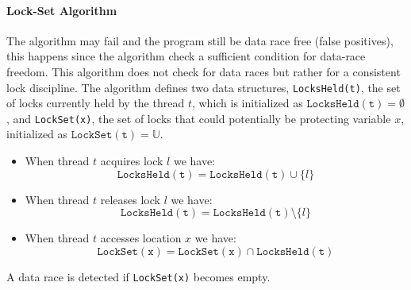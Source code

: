 \paragraph{Lock-Set Algorithm}
The algorithm may fail and the program still be data race free (false positives),
this happens since the algorithm check a sufficient condition for data-race freedom.
This algorithm does not check for data races but rather for a consistent lock discipline.
The algorithm defines two data structures, \texttt{LocksHeld(t)},
the set of locks currently held by the thread $t$,
which is initialized as $\mathtt{LocksHeld(t)} = \emptyset$,
and \texttt{LockSet(x)}, the set of locks that could potentially be protecting variable $x$,
initialized as $\mathtt{LockSet(t)} = \mathbb{U}$.
\begin{itemize}
  \item When thread $t$ acquires lock $l$ we have:$$\mathtt{LocksHeld(t)} = \mathtt{LocksHeld(t)} \cup \{l\}$$
  \item When thread $t$ releases lock $l$ we have:$$\mathtt{LocksHeld(t)} = \mathtt{LocksHeld(t)} \setminus \{l\}$$
  \item When thread $t$ accesses location $x$ we have:$$\mathtt{LockSet(x)} = \mathtt{LockSet(x)} \cap \mathtt{LocksHeld(t)}$$
\end{itemize}
A data race is detected if \texttt{LockSet(x)} becomes empty.